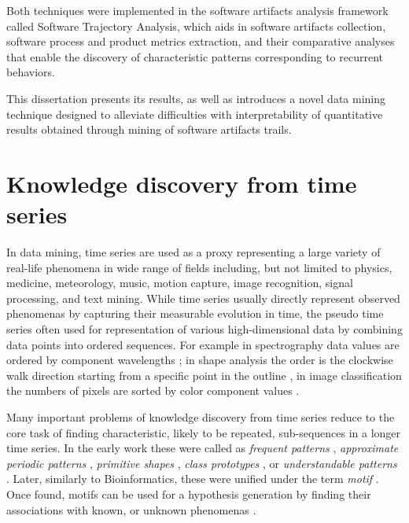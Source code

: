 Both techniques were implemented in the software artifacts analysis framework called Software Trajectory 
Analysis, which aids in software artifacts collection, software process and product metrics extraction, 
and their comparative analyses that enable the discovery of characteristic patterns corresponding to 
recurrent behaviors.

This dissertation presents its results, as well as introduces a novel data mining technique designed to 
alleviate difficulties with interpretability of quantitative results obtained through mining of software
artifacts trails. 

%
%
\section{Knowledge discovery from time series}\label{section_knowledge_discovery}
In data mining, time series are used as a proxy representing a large variety of real-life phenomena 
in wide range of fields including, but not limited to physics, medicine, meteorology, 
music, motion capture, image recognition, signal processing, and text mining. 
While time series usually directly represent observed phenomenas by capturing their measurable evolution 
in time, the pseudo time series often used for representation of various high-dimensional data 
by combining data points into ordered sequences. 
For example in spectrography data values are ordered by component wavelengths \cite{citeulike:12550833};
in shape analysis the order is the clockwise walk direction starting from a
specific point in the outline \cite{citeulike:12550835}, in image classification the numbers of pixels
are sorted by color component values \cite{citeulike:2900542}.

Many important problems of knowledge discovery from time series reduce to the core task of finding 
characteristic, likely to be repeated, sub-sequences in a longer time series. 
In the early work these were called as 
\textit{frequent patterns} \cite{citeulike:5159615}, 
\textit{approximate periodic patterns} \cite{citeulike:1959582},
\textit{primitive shapes} \cite{citeulike:5898869}, 
\textit{class prototypes} \cite{citeulike:4406444}, 
or \textit{understandable patterns} \cite{citeulike:3978076}. 
Later, similarly to Bioinformatics, these were unified under the term \textit{motif} \cite{citeulike:3977965}.
Once found, motifs can be used for a hypothesis generation by finding their associations with known,
or unknown phenomenas \cite{citeulike:3977965}. 

